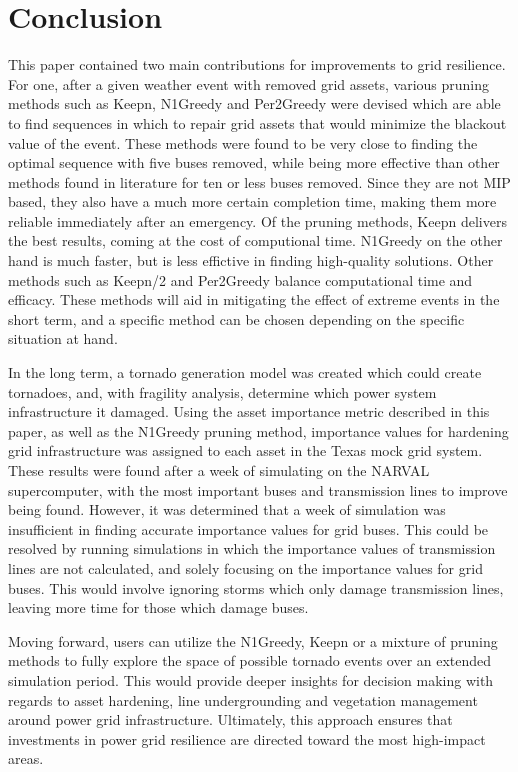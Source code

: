 \documentclass[12pt]{article}
\begin{document}
\section{Conclusion}
This paper contained two main contributions for improvements to grid resilience. For one, after a given weather event with removed grid assets, various pruning methods such as Keepn, N1Greedy and Per2Greedy were devised which are able to find sequences in which to repair grid assets that would minimize the blackout value of the event. These methods were found to be very close to finding the optimal sequence with five buses removed, while being more effective than other methods found in literature for ten or less buses removed. Since they are not MIP based, they also have a much more certain completion time, making them more reliable immediately after an emergency. Of the pruning methods, Keepn delivers the best results, coming at the cost of computional time. N1Greedy on the other hand is much faster, but is less effictive in finding high-quality solutions. Other methods such as Keepn/2 and Per2Greedy balance computational time and efficacy. These methods will aid in mitigating the effect of extreme events in the short term, and a specific method can be chosen depending on the specific situation at hand. \par
In the long term, a tornado generation model was created which could create tornadoes, and, with fragility analysis, determine which power system infrastructure it damaged. Using the asset importance metric described in this paper, as well as the N1Greedy pruning method, importance values for hardening grid infrastructure was assigned to each asset in the Texas mock grid system. These results were found after a week of simulating on the NARVAL supercomputer, with the most important buses and transmission lines to improve being found. However, it was determined that a week of simulation was insufficient in finding accurate importance values for grid buses. This could be resolved by running simulations in which the importance values of transmission lines are not calculated, and solely focusing on the importance values for grid buses. This would involve ignoring storms which only damage transmission lines, leaving more time for those which damage buses. \par
Moving forward, users can utilize the N1Greedy, Keepn or a mixture of pruning methods to fully explore the space of possible tornado events over an extended simulation period. This would provide deeper insights for decision making with regards to asset hardening, line undergrounding and vegetation management around power grid infrastructure. Ultimately, this approach ensures that investments in power grid resilience are directed toward the most high-impact areas. \par
\end{document}
